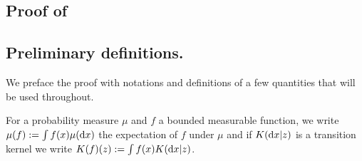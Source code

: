 \subsection{Proof of }
\label{proof:kldiv:filtering}
\subsection*{Preliminary definitions.}
We preface the proof with notations and definitions of a few quantities that will be used throughout. 

For a probability measure $\mu$ and $f$ a bounded measurable function, we write $\mu(f) := \int f(x) \mu(\mathrm{d} x)$  the expectation of $f$ under $\mu$ and if $K(\mathrm{d} x|z)$ is a transition kernel we write $K(f)(z) := \int f(x) K(\mathrm{d} x|z)$.

